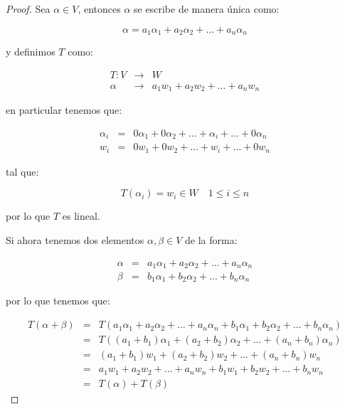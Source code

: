 		\begin{proof}
			Sea $\alpha \in V$, entonces $\alpha$ se escribe de manera única como:

			\begin{equation*}
				\alpha = a_1 \alpha_1 + a_2 \alpha_2 + \dots + a_n \alpha_n
			\end{equation*}

			y definimos $T$ como:

			\begin{eqnarray*}
				T \colon V & \to & W \\
				\alpha & \to & a_1 w_1 + a_2 w_2 + \dots + a_n w_n
			\end{eqnarray*}

			en particular tenemos que:

			\begin{eqnarray*}
				\alpha_i & = & 0 \alpha_1 + 0 \alpha_2 + \dots  + \alpha_i + \dots + 0 \alpha_n \\
				w_i & = & 0 w_1 + 0 w_2 + \dots  + w_i + \dots + 0 w_n
			\end{eqnarray*}

			tal que:

			\begin{equation*}
				T(\alpha_i) = w_i \in W \quad 1 \leq i \leq n
			\end{equation*}

			por lo que $T$ es lineal.

			Si ahora tenemos dos elementos $\alpha, \beta \in V$ de la forma:

			\begin{eqnarray*}
				\alpha & = & a_1 \alpha_1 + a_2 \alpha_2 + \dots + a_n \alpha_n \\
				\beta & = & b_1 \alpha_1 + b_2 \alpha_2 + \dots + b_n \alpha_n
			\end{eqnarray*}

			por lo que tenemos que:

			\begin{eqnarray*}
				T(\alpha + \beta) & = & T(a_1 \alpha_1 + a_2 \alpha_2 + \dots + a_n \alpha_n + b_1 \alpha_1 + b_2 \alpha_2 + \dots + b_n \alpha_n) \\
				& = & T((a_1 + b_1) \alpha_1 + (a_2 + b_2) \alpha_2 + \dots + (a_n + b_n) \alpha_n) \\
				& = & (a_1 + b_1) w_1 + (a_2 + b_2) w_2 + \dots + (a_n + b_n) w_n \\
				& = & a_1 w_1 + a_2 w_2 + \dots + a_n w_n + b_1 w_1 + b_2 w_2 + \dots + b_n w_n \\
				& = & T(\alpha) + T(\beta)
			\end{eqnarray*}


\end{proof}

